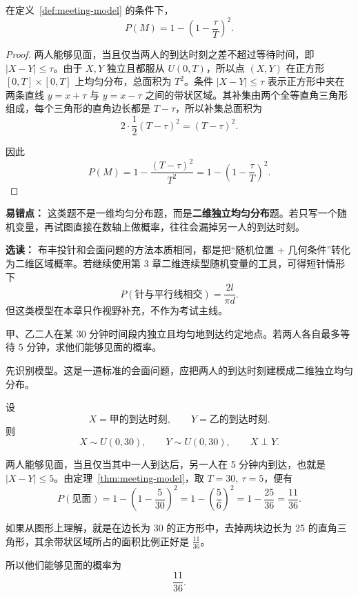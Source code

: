 ﻿\documentclass[lang=cn,11pt]{elegantbook}
\begin{document}
\begin{theorem}[会面概率公式]\label{thm:meeting-model}
在定义~\ref{def:meeting-model} 的条件下，
\[
P(M)=1-\left(1-\frac{\tau}{T}\right)^2.
\]
\end{theorem}

\begin{proof}
两人能够见面，当且仅当两人的到达时刻之差不超过等待时间，即 \(|X-Y|\le \tau\)。由于 \(X,Y\) 独立且都服从 \(U(0,T)\)，所以点 \((X,Y)\) 在正方形 \([0,T]\times[0,T]\) 上均匀分布，总面积为 \(T^2\)。条件 \(|X-Y|\le \tau\) 表示正方形中夹在两条直线 \(y=x+\tau\) 与 \(y=x-\tau\) 之间的带状区域。其补集由两个全等直角三角形组成，每个三角形的直角边长都是 \(T-\tau\)，所以补集总面积为
\[
2\cdot\frac12(T-\tau)^2=(T-\tau)^2.
\]

因此
\[
P(M)=1-\frac{(T-\tau)^2}{T^2}
=1-\left(1-\frac{\tau}{T}\right)^2.
\]
\end{proof}

\begin{note}
\textbf{易错点：} 这类题不是一维均匀分布题，而是\textbf{二维独立均匀分布}题。若只写一个随机变量，再试图直接在数轴上做概率，往往会漏掉另一人的到达时刻。

\textbf{选读：} 布丰投针和会面问题的方法本质相同，都是把“随机位置 + 几何条件”转化为二维区域概率。若继续使用第 3 章二维连续型随机变量的工具，可得短针情形下
\[
P(\text{针与平行线相交})=\frac{2l}{\pi d}.
\]
但这类模型在本章只作视野补充，不作为考试主线。
\end{note}

\begin{exercise}[会面问题]\label{ex:meeting_problem}
甲、乙二人在某 30 分钟时间段内独立且均匀地到达约定地点。若两人各自最多等待 5 分钟，求他们能够见面的概率。
\end{exercise}

\begin{solution}
先识别模型。这是一道标准的会面问题，应把两人的到达时刻建模成二维独立均匀分布。

设
\[
X=\text{甲的到达时刻},\qquad Y=\text{乙的到达时刻}.
\]
则
\[
X\sim U(0,30),\qquad Y\sim U(0,30),\qquad X\perp Y.
\]

两人能够见面，当且仅当其中一人到达后，另一人在 5 分钟内到达，也就是 \(|X-Y|\le 5\)。由定理~\ref{thm:meeting-model}，取 \(T=30,\ \tau=5\)，便有
\[
P(\text{见面})=1-\left(1-\frac{5}{30}\right)^2
=1-\left(\frac56\right)^2
=1-\frac{25}{36}
=\frac{11}{36}.
\]

如果从图形上理解，就是在边长为 30 的正方形中，去掉两块边长为 25 的直角三角形，其余带状区域所占的面积比例正好是 \(\frac{11}{36}\)。

所以他们能够见面的概率为
\[
\frac{11}{36}.
\]
\end{solution}
\end{document}
